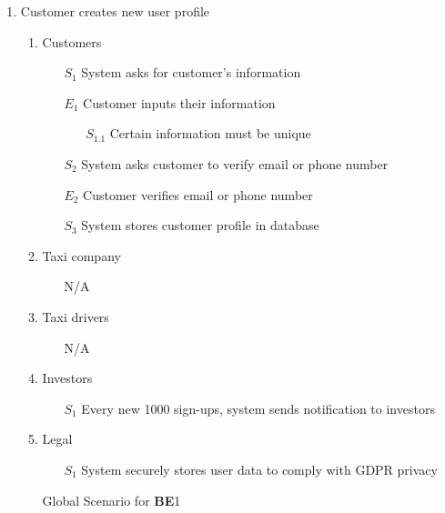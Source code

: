 \documentclass[]{article}
\begin{document}
\begin{enumerate}[{\textbf{BE}}1.]
    \item Customer creates new user profile
    \begin{enumerate}[{\textbf{VP}1}.1]
        \item Customers
            \begin{enumerate}
                \item[$S_1$] System asks for customer’s information
                \item[$E_1$] Customer inputs their information
                \begin{enumerate}
                    \item[$S_{1.1}$] Certain information must be unique
                \end{enumerate}
\color{blue}
                \item[$S_2$] System asks customer to verify email or phone number
                \item[$E_2$] Customer verifies email or phone number
\color{black}
                \item[$S_3$] System stores customer profile in database
            \end{enumerate}
        \item Taxi company
            \begin{enumerate}
                \item[N/A]
            \end{enumerate}
        \item Taxi drivers
            \begin{enumerate}
                \item[N/A]
            \end{enumerate}
        \item Investors
            \begin{enumerate}
	       \color{blue}
                \item[$S_1$] Every new 1000 sign-ups, system sends notification to investors
                \color{black}
            \end{enumerate}
        \item Legal
            \begin{enumerate}
                \item[$S_1$] System securely stores user data to comply with GDPR privacy
            \end{enumerate}
        \item[Global] Scenario for \textbf{BE}1

\end{enumerate}
\end{enumerate}
\end{document}
